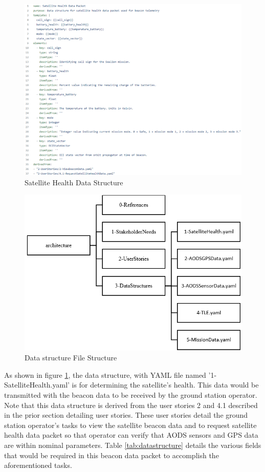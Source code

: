 \documentclass[journal,article,submit,pdftex,moreauthors]{Definitions/mdpi}
\begin{document}
\begin{figure}[H]
    \includegraphics[width=12 cm]{assets/datastructure.png}
    \caption{Satellite Health Data Structure}
	\label{fig:datastructure}
    \end{figure}   
\unskip

\begin{figure}[H]
    \includegraphics[width=10.5 cm]{assets/datastructure_file.png}
    \caption{Data structure File Structure}
	\label{fig:datastructure_file}
    \end{figure}
	\noindent   
\unskip

As shown in figure \ref{fig:datastructure}, the data structure, with YAML file named '1-SatelliteHealth.yaml' is for determining the satellite's health.  This data would be transmitted with the beacon data to be received by the ground station operator.  Note that this data structure is derived from the user stories 2 and 4.1 described in the prior section detailing user stories.  These user stories detail the ground station operator's tasks to view the satellite beacon data and to request satellite health data packet so that operator can verify that AODS sensors and GPS data are within nominal parameters.  Table \ref{tab:datastructure} details the various fields that would be required in this beacon data packet to accomplish the aforementioned tasks.
\end{document}
